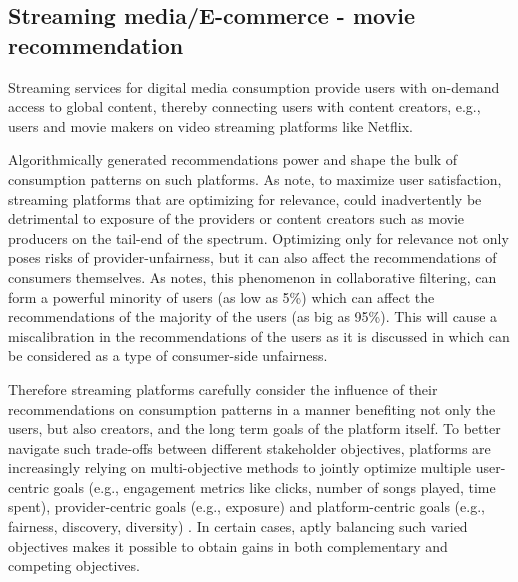 

    \subsection{Streaming media/E-commerce - movie recommendation}

    Streaming services for digital media consumption provide users with on-demand access to global content, thereby connecting users with content creators, e.g., users and movie makers on video streaming platforms like Netflix.
    
    Algorithmically generated recommendations power and shape the bulk of consumption patterns on such platforms. As \cite{mehrotra2018towards} note, to maximize user satisfaction, streaming platforms that are optimizing for relevance, could inadvertently be detrimental to exposure of the providers or content creators such as movie producers on the tail-end of the spectrum. Optimizing only for relevance not only poses risks of provider-unfairness, but it can also affect the recommendations of consumers themselves. As \cite{eskandanian2019power} notes, this phenomenon in collaborative filtering, can form a powerful minority of users (as low as 5\%) which can affect the recommendations of the majority of the users (as big as 95\%). This will cause a miscalibration in the recommendations of the users as it is discussed in \cite{steck2018calibrated} which can be considered as a type of consumer-side unfairness. 
    
    Therefore streaming platforms carefully consider the influence of their recommendations on consumption patterns in a manner benefiting not only the users, but also creators, and the long term goals of the platform itself. To better navigate such trade-offs between different stakeholder objectives, platforms are increasingly relying on multi-objective methods to jointly optimize multiple user-centric goals (e.g., engagement metrics like clicks, number of songs played, time spent), provider-centric goals (e.g., exposure) and platform-centric goals (e.g., fairness, discovery, diversity) \cite{mehrotra2020bandit}. In certain cases, aptly balancing such varied objectives makes it possible to obtain gains in both complementary and competing objectives.
    
